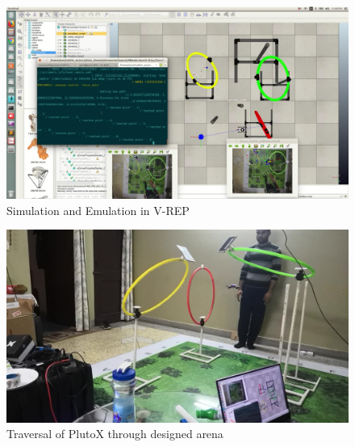 \begin{figure}[H]
    \centering
    \includegraphics[width=\linewidth]{SummerInterReport/project/Images-Major/simul.png}
    \caption{Simulation and Emulation in V-REP}
    \label{fig:simul}
\end{figure}
\begin{figure}[H]
    \centering
    \includegraphics[width=\linewidth]{SummerInterReport/project/Images-Major/finalarena.jpeg}
    \caption{Traversal of PlutoX through designed arena}
    \label{fig:simul}
\end{figure}
